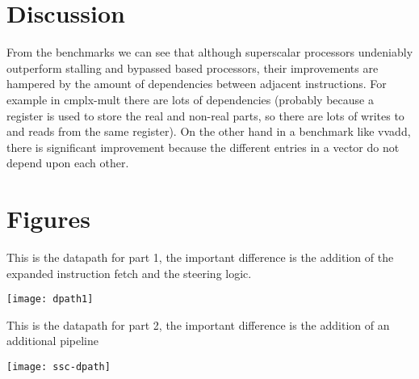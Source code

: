 \documentclass[a4paper, 12pt]{article}
\begin{document}
\section{Discussion}
From the benchmarks we can see that although superscalar processors undeniably outperform stalling and bypassed based processors, their improvements are hampered by the amount of dependencies between adjacent instructions. For example in cmplx-mult there are lots of dependencies (probably because a register is used to store the real and non-real parts, so there are lots of writes to and reads from the same register). On the other hand in a benchmark like vvadd, there is significant improvement because the different entries in a vector do not depend upon each other. 

\section{Figures}
This is the datapath for part 1, the important difference is the addition of the expanded instruction fetch and the steering logic.

\texttt{[image: dpath1]}

This is the datapath for part 2, the important difference is the addition of an additional pipeline

\texttt{[image: ssc-dpath]}
\end{document}
